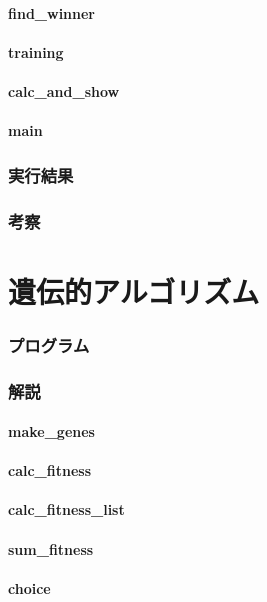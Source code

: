 \documentclass{jsarticle}
\begin{document}
\subsection{find\_winner}
\subsection{training}
\subsection{calc\_and\_show}
\subsection{main}
\section{実行結果}
\section{考察}

\part{遺伝的アルゴリズム}
\section{プログラム}


\section{解説}
\subsection{make\_genes}
\subsection{calc\_fitness}
\subsection{calc\_fitness\_list}
\subsection{sum\_fitness}
\subsection{choice}
\end{document}
